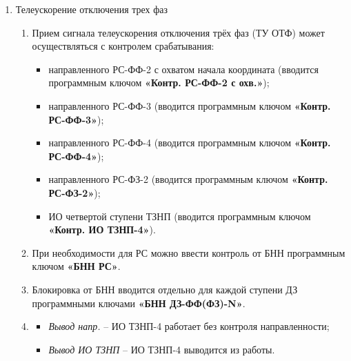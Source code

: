 \begin{enumerate}
\begin{enumerate}
\item 
Если программный ключ \textbf{«Прием Тоткл с контр.»} выведен, то сигнал на отключение выключателя при приеме сигнала телеотключения формируется без контролей.

\item
Передача команды телеотключения на противоположный конец линии осуществляется при срабатывании ЗНР, срабатывании внутреннего УРОВ или по сигналу срабатывания внешнего УРОВ, а также от внешнего сигнала \textit{«ЛС/Tоткл: Внеш. пуск Тоткл»}.

\item
Уставки телеотключения представлены в таблице \ref{app_set:ls}.

\end{enumerate}

\item Телеускорение отключения трех фаз
\begin{enumerate}

\item
Прием сигнала телеускорения отключения трёх фаз (ТУ ОТФ) может осуществляться с контролем срабатывания:

\begin{itemize}
    \item направленного РС-ФФ-2 с охватом начала координата (вводится программным ключом \textbf{«Контр. РС-ФФ-2 с охв.»});
    \item направленного РС-ФФ-3 (вводится программным ключом \textbf{«Контр. РС-ФФ-3»});
    \item направленного РС-ФФ-4 (вводится программным ключом \textbf{«Контр. РС-ФФ-4»});
    \item направленного РС-ФЗ-2 (вводится программным ключом \textbf{«Контр. РС-ФЗ-2»});
    \item ИО четвертой ступени ТЗНП (вводится программным ключом \textbf{«Контр. ИО ТЗНП-4»}).
\end{itemize}

\item
При необходимости для РС можно ввести контроль от БНН программным ключом \textbf{«БНН РС»}.

\item
Блокировка от БНН вводится отдельно для каждой ступени ДЗ программными ключами \textbf{«БНН ДЗ-ФФ(ФЗ)-N»}.

\item
{}
\begin{itemize}
    \item \textit{Вывод напр.} -- ИО ТЗНП-4 работает без контроля направленности;
    \item \textit{Вывод ИО ТЗНП} -- ИО ТЗНП-4 выводится из работы.
\end{itemize}


\end{enumerate}
\end{enumerate}
